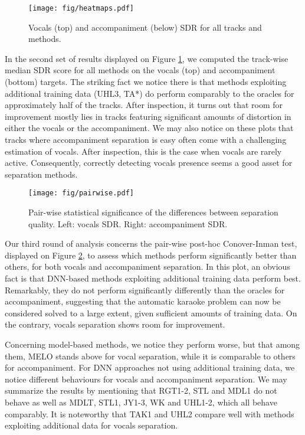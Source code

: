 \documentclass{llncs}
\begin{document}
\begin{figure}
  \begin{center}
     \texttt{[image: fig/heatmaps.pdf]}
     \vspace{-1cm}
  \end{center}
  \caption{Vocals (top) and accompaniment (below) SDR for all tracks and methods.}
  \label{fig:trackwise_scores}
\end{figure}

In the second set of results displayed on Figure \ref{fig:trackwise_scores}, we computed the track-wise median SDR score for all methods on the vocals (top) and accompaniment (bottom) targets. The striking fact we notice there is that methods exploiting additional training data (UHL3, TA*) do perform comparably to the oracles for approximately half of the tracks. After inspection, it turns out that room for improvement mostly lies in tracks featuring significant amounts of distortion in either the vocals or the accompaniment. We may also notice on these plots that tracks where accompaniment separation is easy often come with a challenging estimation of vocals. After inspection, this is the case when vocals are rarely active. Consequently, correctly detecting vocals presence seems a good asset for separation methods.

\begin{figure}[h]
  \begin{center}
     \texttt{[image: fig/pairwise.pdf]}
     \vspace{-1cm}
  \end{center}
  \caption{Pair-wise statistical significance of the differences between separation quality. Left: vocals SDR. Right: accompaniment SDR.}
  \label{fig:pairwise_matrix}
\end{figure}

Our third round of analysis concerns the pair-wise post-hoc Conover-Inman test, displayed on Figure \ref{fig:pairwise_matrix}, to assess which methods perform significantly better than others, for both vocals and accompaniment separation. In this plot, an obvious fact is that DNN-based methods exploiting additional training data perform best. Remarkably, they do not perform significantly differently than the oracles for accompaniment, suggesting that the automatic karaoke problem can now be considered solved to a large extent, given sufficient amounts of training data. On the contrary, vocals separation shows room for improvement.

Concerning model-based methods, we notice they perform worse, but that among them, MELO stands above for vocal separation, while it is comparable to others for accompaniment. For DNN approaches not using additional training data, we notice different behaviours for vocals and accompaniment separation. We may summarize the results by mentioning that RGT1-2, STL and MDL1 do not behave as well as MDLT, STL1, JY1-3, WK and UHL1-2, which all behave comparably. It is noteworthy that TAK1 and UHL2 compare well with methods exploiting additional data for vocals separation.
\end{document}
